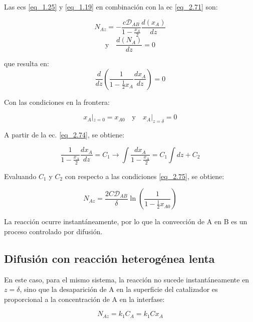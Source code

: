 Las ecs \eqref{eq_1.25} y \eqref{eq_1.19} en combinación con la ec \eqref{eq_2.71} son:

\begin{equation}
    N_{Az}=-\frac{c\mathscr{D}_{AB}}{1-\frac{x_A}{2}}\frac{d(x_A)}{dz}
\end{equation}
\begin{equation}
   \text{y} \quad \frac{d(N_A)}{dz}=0
\end{equation}


que resulta en:
\begin{equation}
    \frac{d}{dz}\left(\frac{1}{1-\frac{1}{2}x_A}\frac{dx_A}{dz}\right)=0
    \label{eq_2.74}
\end{equation}




Con las condiciones en la frontera:

\begin{equation}
    x_A |_{z=0} = x_{A0}\quad \text{y} \quad x_A |_{z=\delta} = 0
    \label{eq_2.75}
\end{equation}

A partir de la ec. \eqref{eq_2.74}, se obtiene:

\begin{equation*}
    \frac{1}{1-\frac{x_A}{2}}\frac{dx_A}{dz}=C_1\longrightarrow \int\frac{dx_A}{1-\frac{x_A}{2}}=C_1\int dz +C_2
\end{equation*}

Evaluando $C_1$ y $C_2$ con respecto a las condiciones \eqref{eq_2.75}, se obtiene:

\begin{equation}
    N_{Az}=\frac{2C\mathscr{D}_{AB}}{\delta}\ln\left(\frac{1}{1-\frac{1}{2}x_{A0}}\right)
    \label{eq_2.76}
\end{equation}

La reacción ocurre instantáneamente, por lo que la convección de A en B es un proceso controlado por difusión.

\subsection{Difusión con reacción heterogénea lenta}

En este caso, para el mismo sistema, la reacción no sucede instantáneamente en $z=\delta$, sino que la desaparición de A en la superficie del catalizador es proporcional a la concentración de A en la interfase:

\begin{equation}
    N_{Az}=k_1C_A=k_1Cx_A
\end{equation}

